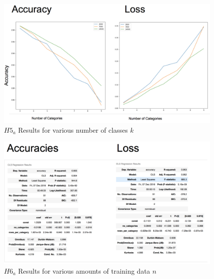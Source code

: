 \documentclass[11pt]{article}
\begin{document}
\begin{figure}[h!]
  \begin{center}
    \includegraphics[scale=0.5]{fig10}
    \end{center}
  \caption{$H5_a$ Results for various number of classes $k$}
  \label{fig:h5Results}
\end{figure}


\begin{figure}[h!]
  \begin{center}
    \includegraphics[scale=0.5]{fig11}
    \end{center}
  \caption{$H6_a$ Results for various amounts of training data $n$}
  \label{fig:h6Results}
  \end{figure}
\end{document}
